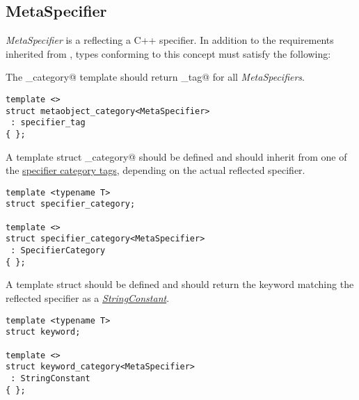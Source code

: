 \subsection{MetaSpecifier}
\label{concept-MetaSpecifier}

{\em MetaSpecifier} is a  reflecting a C++ specifier. In addition to the requirements
inherited from , types conforming to this concept must satisfy the following:

The \verb@metaobject_category@ template should return \verb@specifier_tag@ for all {\em MetaSpecifiers}.

\begin{lstlisting}
template <>
struct metaobject_category<MetaSpecifier>
 : specifier_tag
{ };
\end{lstlisting}

A template struct \verb@specifier_category@ should be defined and should inherit from one of the
\hyperref[specifier-category-tags]{specifier category tags}, depending on
the actual reflected specifier.

\begin{lstlisting}
template <typename T>
struct specifier_category;

template <>
struct specifier_category<MetaSpecifier>
 : SpecifierCategory
{ };
\end{lstlisting}

A template struct \verb@keyword@ should be defined and should return
the keyword matching the reflected specifier as a
\hyperref[concept-StringConstant]{\em StringConstant}.

\begin{lstlisting}
template <typename T>
struct keyword;

template <>
struct keyword_category<MetaSpecifier>
 : StringConstant
{ };
\end{lstlisting}

